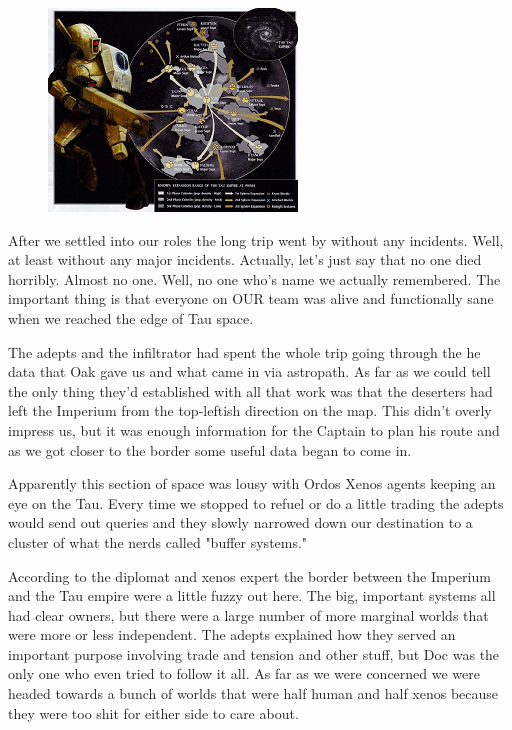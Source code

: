 \begin{figure}
	\begin{center}
		\includegraphics[width=\figwidth]{pics/10/11.png}
	\end{center}
\end{figure}
After we settled into our roles the long trip went by without any incidents. 
Well, at least without any major incidents. 
Actually, let's just say that no one died horribly. 
Almost no one. 
Well, no one who's name we actually remembered. 
The important thing is that everyone on OUR team was alive and functionally sane when we reached the edge of Tau space.

The adepts and the infiltrator had spent the whole trip going through the he data that Oak gave us and what came in via astropath. 
As far as we could tell the only thing they'd established with all that work was that the deserters had left the Imperium from the top-leftish direction on the map. 
This didn't overly impress us, but it was enough information for the Captain to plan his route and as we got closer to the border some useful data began to come in.

Apparently this section of space was lousy with Ordos Xenos agents keeping an eye on the Tau. 
Every time we stopped to refuel or do a little trading the adepts would send out queries and they slowly narrowed down our destination to a cluster of what the nerds called "buffer systems." 

According to the diplomat and xenos expert the border between the Imperium and the Tau empire were a little fuzzy out here. 
The big, important systems all had clear owners, but there were a large number of more marginal worlds that were more or less independent. 
The adepts explained how they served an important purpose involving trade and tension and other stuff, but Doc was the only one who even tried to follow it all. 
As far as we were concerned we were headed towards a bunch of worlds that were half human and half xenos because they were too shit for either side to care about.

